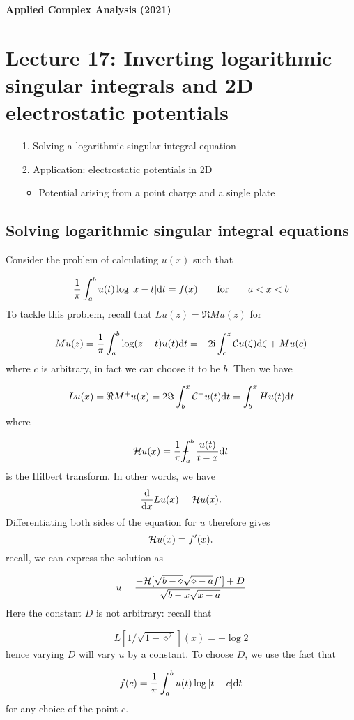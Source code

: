 \documentclass[12pt,landscape]{article}
\def\qqfor{\qquad\hbox{for}\qquad}
\def\D{ {\rm d} }
\def\I{ {\rm i} }
\def\CC{ {\cal C} }
\def\HH{ {\cal H} }
\def\Xint#1{ \mathchoice
   {\XXint\displaystyle\textstyle{#1} }%
   {\XXint\textstyle\scriptstyle{#1} }%
   {\XXint\scriptstyle\scriptscriptstyle{#1} }%
   {\XXint\scriptscriptstyle\scriptscriptstyle{#1} }%
   \!\int}
\def\XXint#1#2#3{ {\setbox0=\hbox{$#1{#2#3}{\int}$}
     \vcenter{\hbox{$#2#3$}}\kern-.5\wd0} }
\def\dashint{\Xint-}
\def\dx{\D x}
\def\dt{\D t}
\begin{document}
{\LARGE
\sf
\textbf{Applied Complex Analysis (2021)}

\section{Lecture 17: Inverting logarithmic singular integrals and 2D electrostatic potentials}
\begin{itemize}
\item[1. ] Solving a logarithmic singular integral equation


\item[2. ] Application: electrostatic potentials in 2D

\begin{itemize}
\item Potential arising from a point charge and a single plate

\end{itemize}
\end{itemize}
\subsection{Solving logarithmic singular integral equations}
Consider the problem of calculating $u(x)$ such that

\[
{1 \over \pi} \int_a^b u(t) \log | x-t| \dt = f(x) \qqfor a < x < b
\]
To tackle this problem, recall that $L u(z) = \Re M u(z)$ for

\[
M u(z) = {1 \over \pi} \int_a^b \log(z-t) u(t) \D t =  -2 \I \int_c^z \CC u(\zeta) \D \zeta + M u(c)
\]
where $c$ is arbitrary, in fact we can choose it to be $b$. Then we have

\[
L u(x) =  \Re M^+ u(x) = 2\Im \int_b^x \CC^+ u(t) \D t =  \int_b^x H u(t) \D t
\]
where

\[
\HH u(x) = {1 \over \pi} \dashint_a^b {u(t) \over t -x } \D t
\]
is the Hilbert transform. In other words, we have
\[
{\D \over \dx} L u(x) = \HH u(x).
\]
Differentiating both sides of the equation for $u$ therefore gives
\[
\HH u(x) = f'(x).
\]
recall, we can express the solution as

\[
    u = {-\HH[\sqrt{b-\diamond}\sqrt{\diamond-a} f'] + D \over \sqrt{b-x}\sqrt{x-a}}
\]
Here the constant $D$ is not arbitrary: recall that

\[
L[1/\sqrt{1-\diamond^2}](x) = - \log 2
\]
hence varying $D$ will vary $u$ by a constant. To choose $D$,  we use the fact that

\[
f(c) = {1 \over \pi} \int_a^b u(t) \log |t-c| \dt
\]
for any choice of the point  $c$.

}
\end{document}
